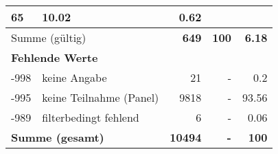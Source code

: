 \begin{longtable}{lXrrr}
       \num{65} &
       \num[round-mode=places,round-precision=2]{10.02} &
         \num[round-mode=places,round-precision=2]{0.62} \\
     \midrule
     \multicolumn{2}{l}{Summe (gültig)} &
       \textbf{\num{649}} &
     \textbf{\num{100}} &
       \textbf{\num[round-mode=places,round-precision=2]{6.18}} \\
     \multicolumn{5}{l}{\textbf{Fehlende Werte}}\\
       -998 &
       keine Angabe &
         \num{21} &
        - &
         \num[round-mode=places,round-precision=2]{0.2} \\
       -995 &
       keine Teilnahme (Panel) &
         \num{9818} &
        - &
         \num[round-mode=places,round-precision=2]{93.56} \\
       -989 &
       filterbedingt fehlend &
         \num{6} &
        - &
         \num[round-mode=places,round-precision=2]{0.06} \\
     \midrule
     \multicolumn{2}{l}{\textbf{Summe (gesamt)}} &
          \textbf{\num{10494}} &
        \textbf{-} &
        \textbf{\num{100}} \\
     \bottomrule
     \end{longtable}
     
